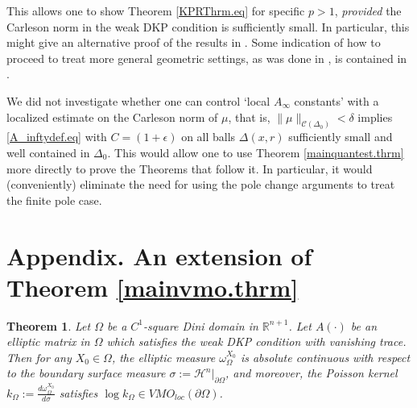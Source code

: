 \documentclass[11pt, a4paper,leqno]{amsart}
\theoremstyle{plain}
\newtheorem{theorem}[equation]{Theorem}
\theoremstyle{definition}
\theoremstyle{remark}
\numberwithin{equation}{section}
\newcommand{\RR}{{\mathbb{R}}}
\newcommand{\pO}{\partial\Omega}
\begin{document}
This allows one to show Theorem \ref{KPRThrm.eq} for specific $p > 1$, {\it provided} the Carleson norm in the weak DKP condition is sufficiently small. In particular, this might give an alternative proof of the results in \cite{DPP}. Some indication of how to proceed to treat more general geometric settings, as was done in \cite{DPP}, is contained in \cite[Section 5]{BES}.

We did not investigate whether one can control `local $A_\infty$ constants' with a localized estimate on the Carleson norm of $\mu$, that is, $\|\mu\|_{\mathcal{C}(\Delta_0)}< \delta$ implies \eqref{A_inftydef.eq} with $C = (1 + \epsilon)$ on all balls $\Delta(x,r)$ sufficiently small and well contained in $\Delta_0$. This would allow one to use Theorem \ref{mainquantest.thrm} more directly to prove the Theorems that follow it. In particular, it would (conveniently) eliminate the need for using the pole change arguments to treat the finite pole case.






\appendix
\renewcommand{\theequation}{A.\arabic{equation}}
\section*{Appendix. An extension of Theorem \ref{mainvmo.thrm}}
\begin{theorem}\label{thm:squareDini}
	Let $\Omega$ be a $C^1$-square Dini domain in $\RR^{n+1}$. Let $A(\cdot)$ be an elliptic matrix in $\Omega$ which satisfies the weak DKP condition with vanishing trace. Then for any $X_0 \in \Omega$, the elliptic measure $\omega_\Omega^{X_0}$ is absolute continuous with respect to the boundary surface measure $ \sigma := \mathcal{H}^n|_{\pO}$, and moreover, the Poisson kernel $k_\Omega := \frac{d\omega_\Omega^{X_0}}{d\sigma}$ satisfies $\log k_\Omega  \in VMO_{loc}(\partial\Omega)$.
\end{theorem}
\end{document}
